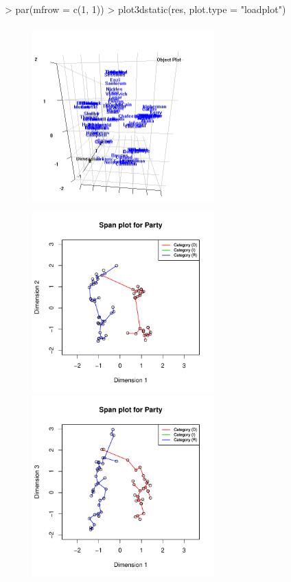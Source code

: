 \documentclass[article, nojss]{jss}
\begin{document}
\begin{Schunk}
\begin{Sinput}
> par(mfrow = c(1, 1))
> plot3dstatic(res, plot.type = "loadplot")
\end{Sinput}
\end{Schunk}

\begin{figure}[ht]
\begin{center}
\includegraphics[height=70mm, width=70mm]{senate.png}
\includegraphics[height=70mm, width=70mm]{senatespan12.pdf}
\includegraphics[height=70mm, width=70mm]{senatespan13.pdf}

\end{center}
\end{figure}
\end{document}
